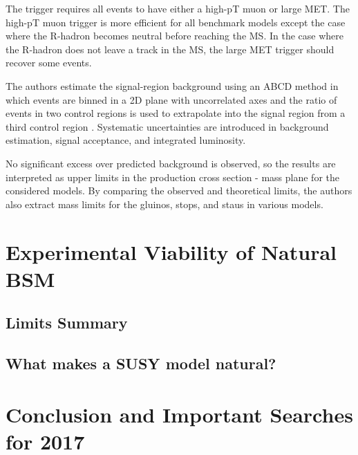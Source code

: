 \documentclass[12pt]{article}
\begin{document}
    The trigger requires all events to have either a high-pT muon or large MET. The high-pT muon trigger is more efficient for all benchmark models except the case where the R-hadron becomes neutral before reaching the MS. In the case where the R-hadron does not leave a track in the MS, the large MET trigger should recover some events.  

    The authors estimate the signal-region background using an ABCD method in which events are binned in a 2D plane with uncorrelated axes and the ratio of events in two control regions is used to extrapolate into the signal region from a third control region . Systematic uncertainties are introduced in background estimation, signal acceptance, and integrated luminosity.

    No significant excess over predicted background is observed, so the results are interpreted as upper limits in the production cross section - mass plane for the considered models. By comparing the observed and theoretical limits, the authors also extract mass limits for the gluinos, stops, and staus in various models. 

\section{Experimental Viability of Natural BSM}
\subsection{Limits Summary}
\subsection{What makes a SUSY model natural?}

\section{Conclusion and Important Searches for 2017}

\clearpage
\pagebreak
\singlespacing
{}

\end{document}
